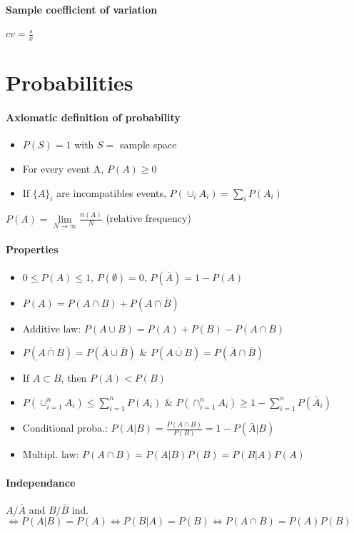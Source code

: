 \documentclass[paper=a4,fontsize=8pt,pagesize,DIV=calc]{scrartcl}
\newcounter{row}
\begin{document}
\begin{multicols}{3}
\paragraph{Sample coefficient of variation} $cv=\frac{s}{\bar{x}}$


\section{Probabilities}
\paragraph{Axiomatic definition of probability}
\begin{itemize}
\item $P(S)=1$ with $S=$ sample space
\item For every event A, $P(A)\geq 0$
\item If $\{A\}_i$ are incompatibles events, $P(\cup_iA_i)=\sum_iP(A_i)$
\end{itemize}
$P(A)=\lim\limits_{N \rightarrow \infty}\frac{n(A)}{N}$ (relative frequency)
\paragraph{Properties}
\begin{itemize}
\item $0\leq P(A)\leq 1 \textrm{, } P(\emptyset)=0 \textrm{, } P(\bar{A})=1-P(A)$
\item $P(A)=P(A\cap B)+P(A\cap \bar{B})$
\item Additive law: $P(A\cup B)=P(A)+P(B)-P(A \cap B)$
\item $P(\overline{A\cap B})=P(\bar{A} \cup \bar{B}) $ \& $ P(\overline{A\cup B})=P(\bar{A} \cap \bar{B})$
\item If $A\subset B$, then $P(A) < P(B)$
\item $P(\cup^n_{i=1} A_i)\leq \sum^n_{i=1} P(A_i)$ \& $P(\cap^n_{i=1} A_i)\geq 1-\sum^n_{i=1} P(\bar{A}_i)$
\item Conditional proba.: $P(A|B)=\frac{P(A\cap B)}{P(B)}=1-P(\bar{A}|B)$
\item Multipl. law: $P(A\cap B)=P(A|B)P(B)=P(B|A)P(A)$
\end{itemize}
\paragraph{Independance} $A/\bar{A}$ and $B/\bar{B}$ ind. $ \Leftrightarrow P(A|B)=P(A) \Leftrightarrow P(B|A)=P(B) \Leftrightarrow P(A\cap B)=P(A)P(B)$

\end{multicols}
\end{document}
